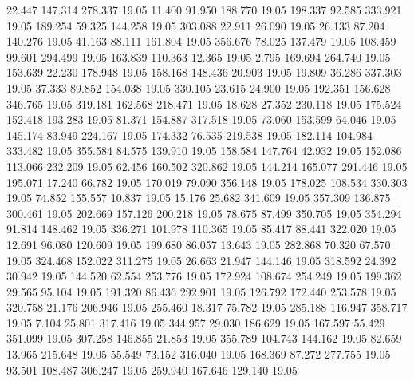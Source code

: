  22.447  147.314  278.337        19.05
  11.400   91.950  188.770        19.05
 198.337   92.585  333.921        19.05
 189.254   59.325  144.258        19.05
 303.088   22.911   26.090        19.05
  26.133   87.204  140.276        19.05
  41.163   88.111  161.804        19.05
 356.676   78.025  137.479        19.05
 108.459   99.601  294.499        19.05
 163.839  110.363   12.365        19.05
   2.795  169.694  264.740        19.05
 153.639   22.230  178.948        19.05
 158.168  148.436   20.903        19.05
  19.809   36.286  337.303        19.05
  37.333   89.852  154.038        19.05
 330.105   23.615   24.900        19.05
 192.351  156.628  346.765        19.05
 319.181  162.568  218.471        19.05
  18.628   27.352  230.118        19.05
 175.524  152.418  193.283        19.05
  81.371  154.887  317.518        19.05
  73.060  153.599   64.046        19.05
 145.174   83.949  224.167        19.05
 174.332   76.535  219.538        19.05
 182.114  104.984  333.482        19.05
 355.584   84.575  139.910        19.05
 158.584  147.764   42.932        19.05
 152.086  113.066  232.209        19.05
  62.456  160.502  320.862        19.05
 144.214  165.077  291.446        19.05
 195.071   17.240   66.782        19.05
 170.019   79.090  356.148        19.05
 178.025  108.534  330.303        19.05
  74.852  155.557   10.837        19.05
  15.176   25.682  341.609        19.05
 357.309  136.875  300.461        19.05
 202.669  157.126  200.218        19.05
  78.675   87.499  350.705        19.05
 354.294   91.814  148.462        19.05
 336.271  101.978  110.365        19.05
  85.417   88.441  322.020        19.05
  12.691   96.080  120.609        19.05
 199.680   86.057   13.643        19.05
 282.868   70.320   67.570        19.05
 324.468  152.022  311.275        19.05
  26.663   21.947  144.146        19.05
 318.592   24.392   30.942        19.05
 144.520   62.554  253.776        19.05
 172.924  108.674  254.249        19.05
 199.362   29.565   95.104        19.05
 191.320   86.436  292.901        19.05
 126.792  172.440  253.578        19.05
 320.758   21.176  206.946        19.05
 255.460   18.317   75.782        19.05
 285.188  116.947  358.717        19.05
   7.104   25.801  317.416        19.05
 344.957   29.030  186.629        19.05
 167.597   55.429  351.099        19.05
 307.258  146.855   21.853        19.05
 355.789  104.743  144.162        19.05
  82.659   13.965  215.648        19.05
  55.549   73.152  316.040        19.05
 168.369   87.272  277.755        19.05
  93.501  108.487  306.247        19.05
 259.940  167.646  129.140        19.05
